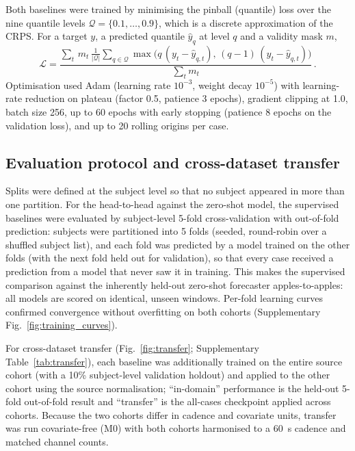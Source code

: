 \documentclass[11pt]{article}
\begin{document}
Both baselines were trained by minimising the pinball (quantile) loss over
the nine quantile levels $\mathcal{Q}=\{0.1,\dots,0.9\}$, which is a discrete
approximation of the CRPS. For a target $y$, a predicted quantile $\hat y_q$
at level $q$ and a validity mask $m$,
\begin{equation}
\mathcal{L} = \frac{\sum_{t}\, m_t \, \frac{1}{|\mathcal{Q}|}\sum_{q\in\mathcal{Q}}
\max\!\big(q\,(y_t-\hat y_{q,t}),\,(q-1)\,(y_t-\hat y_{q,t})\big)}
{\sum_{t} m_t}\, .
\end{equation}
Optimisation used Adam (learning rate $10^{-3}$, weight decay $10^{-5}$) with
learning-rate reduction on plateau (factor 0.5, patience 3 epochs), gradient
clipping at 1.0, batch size 256, up to 60 epochs with early stopping
(patience 8 epochs on the validation loss), and up to 20 rolling origins per
case.

\subsection{Evaluation protocol and cross-dataset transfer}

Splits were defined at the subject level so that no subject appeared in more
than one partition. For the head-to-head against the zero-shot model, the
supervised baselines were evaluated by subject-level 5-fold cross-validation
with out-of-fold prediction: subjects were partitioned into 5 folds (seeded,
round-robin over a shuffled subject list), and each fold was predicted by a
model trained on the other folds (with the next fold held out for
validation), so that every case received a prediction from a model that never
saw it in training. This makes the supervised comparison against the
inherently held-out zero-shot forecaster apples-to-apples: all models are
scored on identical, unseen windows. Per-fold learning curves confirmed
convergence without overfitting on both cohorts (Supplementary
Fig.~\ref{fig:training_curves}).

For cross-dataset transfer (Fig.~\ref{fig:transfer}; Supplementary
Table~\ref{tab:transfer}), each baseline was additionally trained on the
entire source cohort (with a 10\% subject-level validation holdout) and
applied to the other cohort using the source normalisation; ``in-domain''
performance is the held-out 5-fold out-of-fold result and ``transfer'' is the
all-cases checkpoint applied across cohorts. Because the two cohorts differ
in cadence and covariate units, transfer was run covariate-free (M0) with
both cohorts harmonised to a 60~s cadence and matched channel counts.
\end{document}
